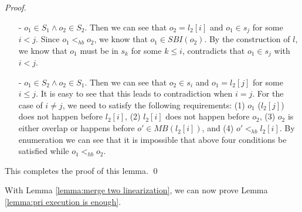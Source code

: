\begin {proof}
\begin{itemize}
\setlength{\itemsep}{0.5pt}
\item[-] $o_1 \in S_1 \wedge o_2 \in S_2$. Then we can see that $o_2=l_2[i]$ and $o_1 \in s_j$ for some $i < j$. Since $o_1 <_{hb} o_2$, we know that $o_1 \in \textit{SBI}(o_2)$. By the construction of $l$, we know that $o_1$ must be in $s_k$ for some $k \leq i$, contradicts that $o_1 \in s_j$ with $i < j$.

\item[-] $o_1 \in S_2 \wedge o_2 \in S_1$. Then we can see that $o_2 \in s_i$ and $o_1 = l_2[j]$ for some $i \leq j$. It is easy to see that this leads to contradiction when $i = j$. For the case of $i \neq j$, we need to satisfy the following requirements: (1) $o_1$ ($l_2[j]$) does not happen before $l_2[i]$, (2) $l_2[i]$ does not happen before $o_2$, (3) $o_2$ is either overlap or happens before $o' \in \textit{MB}(l_2[i])$, and (4) $o' <_{hb} l_2[i]$. By enumeration we can see that it is impossible that above four conditions be satisfied while $o_1 <_{hb} o_2$.
\end{itemize}

This completes the proof of this lemma. \qed
\end {proof}

With Lemma \ref{lemma:merge two linearization}, we can now prove Lemma \ref{lemma:pri execution is enough}.

